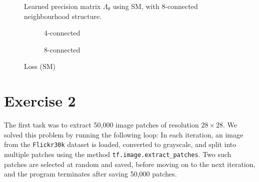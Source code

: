 \documentclass[a4paper]{article}
\theoremstyle{definition}
\theoremstyle{plain}
\begin{document}
\begin{figure}[H]
	\centering
	\begin{subfigure}[b]{0.49\textwidth}
		
		\caption{}
	\end{subfigure}
	\hfill
	\begin{subfigure}[b]{0.49\textwidth}
		
		\caption{}
	\end{subfigure}
	\caption{Learned precision matrix $\Lambda_\theta$ using SM, with 8-connected neighbourhood structure.}
	\label{precision_matrix_SM_fig2}
\end{figure}


\begin{figure}[H]
	\centering
	\begin{subfigure}[b]{0.49\textwidth}
		
		\caption{4-connected}
	\end{subfigure}
	\hfill
	\begin{subfigure}[b]{0.49\textwidth}
		
		\caption{8-connected}
	\end{subfigure}
	\caption{Loss (SM)}
	\label{loss_SM_fig}
\end{figure}





















\section*{\center Exercise 2}

The first task was to extract 50,000 image patches of resolution $28\times 28$. We solved this problem by running the following loop: In each iteration, an image from the \texttt{Flickr30k} dataset is loaded, converted to grayscale, and split into multiple patches using the method \texttt{tf.image.extract\_patches}. Two such patches are selected at random and saved, before moving on to the next iteration, and the program terminates after saving 50,000 patches.
\end{document}

